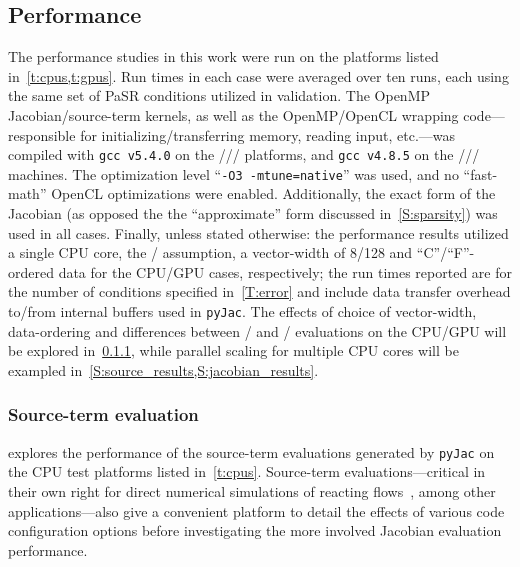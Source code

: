 \documentclass[12pt,number,sort&compress,preprint]{elsarticle}
\begin{document}
\subsection{Performance}
\label{S:results}
The performance studies in this work were run on the platforms listed in~\cref{t:cpus,t:gpus}.
Run times in each case were averaged over ten runs, each using the same set of PaSR conditions utilized in validation.
The OpenMP Jacobian\slash source-term kernels, as well as the OpenMP\slash OpenCL wrapping code---responsible for initializing\slash transferring memory, reading input, etc.---was compiled with \texttt{gcc v5.4.0} on the \avx/\slash\gpunew/ platforms, and \texttt{gcc v4.8.5} on the \sse/\slash\gpuold/ machines.
The optimization level ``\texttt{-O3 -mtune=native}'' was used, and no ``fast-math'' OpenCL optimizations were enabled.
Additionally, the exact form of the Jacobian (as opposed the the ``approximate'' form discussed in~\cref{S:sparsity}) was used in all cases.
Finally, unless stated otherwise: the performance results utilized a single CPU core, the \conp/ assumption, a vector-width of \num{8}\slash\num{128} and ``C''\slash ``F''-ordered data for the CPU\slash GPU cases, respectively; the run times reported are for the number of conditions specified in~\cref{T:error} and include data transfer overhead to\slash from internal buffers used in \texttt{pyJac}.
The effects of choice of vector-width, data-ordering and differences between \conp/ and \conv/ evaluations on the CPU\slash GPU will be explored in~\cref{S:source_results}, while parallel scaling for multiple CPU cores will be exampled in~\cref{S:source_results,S:jacobian_results}.

\subsubsection{Source-term evaluation}
\label{S:source_results}

 explores the performance of the source-term evaluations generated by \texttt{pyJac} on the CPU test platforms listed in~\cref{t:cpus}.
Source-term evaluations---critical in their own right for direct numerical simulations of reacting flows~\cite{Spafford:2010aa}, among other applications---also give a convenient platform to detail the effects of various code configuration options before investigating the more involved Jacobian evaluation performance.
\end{document}

